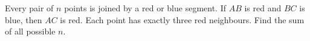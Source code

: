 Every pair of $n$ points is joined by a red or blue segment. If $AB$ is red and $BC$ is blue, then $AC$ is red. Each point has exactly three red neighbours. Find the sum of all possible $n$.
